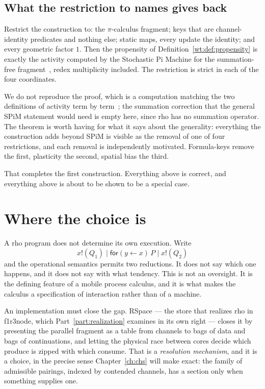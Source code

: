 \subsection{What the restriction to names gives back}
\label{wt:sec:spim}

\begin{theorem}
\label{wt:thm:spim}
Restrict the construction to: the $\pi$-calculus fragment; keys that are channel-identity
predicates and nothing else; static maps, every update the identity; and every geometric
factor $1$. Then the propensity of Definition~\ref{wt:def:propensity} is exactly the
activity computed by the Stochastic Pi Machine for the summation-free
fragment~\cite{spim}, redex multiplicity included. The restriction is strict in each of
the four coordinates.
\end{theorem}

We do not reproduce the proof, which is a computation matching the two definitions of
activity term by term~\cite{StochSim}; the summation correction that the general SPiM
statement would need is empty here, since rho has no summation operator. The theorem is
worth having for what it says about the generality: everything the construction adds
beyond SPiM is visible as the removal of one of four restrictions, and each removal is
independently motivated. Formula-keys remove the first, plasticity the second, spatial
bias the third.

That completes the first construction. Everything above is correct, and everything
above is about to be shown to be a special case.

\section{Where the choice is}
\label{gw:sec:choice}

A rho program does not determine its own execution. Write
\begin{equation}
\label{gw:eq:race}
  x!(Q_1) \mid \textsf{for}(y \leftarrow x)\,P \mid x!(Q_2)
\end{equation}
and the operational semantics permits two reductions. It does not say which one happens,
and it does not say with what tendency. This is not an oversight. It is the defining
feature of a mobile process calculus, and it is what makes the calculus a specification
of interaction rather than of a machine.

An implementation must close the gap. RSpace --- the store that realizes rho in
f1r3node, which Part~\ref{part:realization} examines in its own right --- closes it by
presenting the
parallel fragment as a table from channels to bags of data and bags of continuations,
and letting the physical race between cores decide which produce is zipped with which
consume. That is a \emph{resolution mechanism}, and it is a choice, in the precise sense
Chapter~\ref{ch:chs} will make exact: the family of admissible pairings, indexed by
contended channels, has a section only when something supplies one.

